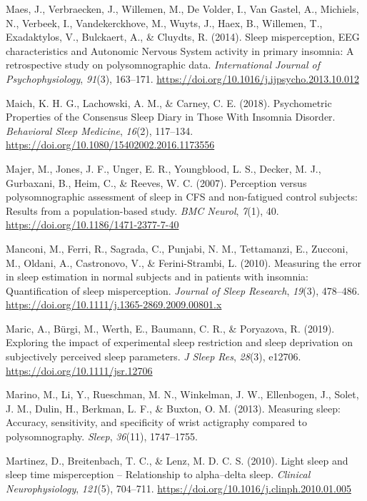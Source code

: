 \documentclass[
]{article}
\newlength{\cslhangindent}
\newenvironment{CSLReferences}[2] %
 {\begin{list}{}{%
  \setlength{\itemindent}{0pt}
  \setlength{\leftmargin}{0pt}
  \setlength{\parsep}{0pt}
  \ifodd #1
   \setlength{\leftmargin}{\cslhangindent}
   \setlength{\itemindent}{-1\cslhangindent}
  \fi
  \setlength{\itemsep}{#2\baselineskip}}}
 {\end{list}}
\begin{document}
\begin{CSLReferences}{1}{0}
Maes, J., Verbraecken, J., Willemen, M., De Volder, I., Van Gastel, A., Michiels, N., Verbeek, I., Vandekerckhove, M., Wuyts, J., Haex, B., Willemen, T., Exadaktylos, V., Bulckaert, A., \& Cluydts, R. (2014). Sleep misperception, {EEG} characteristics and {Autonomic} {Nervous} {System} activity in primary insomnia: {A} retrospective study on polysomnographic data. \emph{International Journal of Psychophysiology}, \emph{91}(3), 163--171. \url{https://doi.org/10.1016/j.ijpsycho.2013.10.012}

Maich, K. H. G., Lachowski, A. M., \& Carney, C. E. (2018). Psychometric {Properties} of the {Consensus} {Sleep} {Diary} in {Those} {With} {Insomnia} {Disorder}. \emph{Behavioral Sleep Medicine}, \emph{16}(2), 117--134. \url{https://doi.org/10.1080/15402002.2016.1173556}

Majer, M., Jones, J. F., Unger, E. R., Youngblood, L. S., Decker, M. J., Gurbaxani, B., Heim, C., \& Reeves, W. C. (2007). Perception versus polysomnographic assessment of sleep in {CFS} and non-fatigued control subjects: Results from a population-based study. \emph{BMC Neurol}, \emph{7}(1), 40. \url{https://doi.org/10.1186/1471-2377-7-40}

Manconi, M., Ferri, R., Sagrada, C., Punjabi, N. M., Tettamanzi, E., Zucconi, M., Oldani, A., Castronovo, V., \& Ferini-Strambi, L. (2010). Measuring the error in sleep estimation in normal subjects and in patients with insomnia: {Quantification} of sleep misperception. \emph{Journal of Sleep Research}, \emph{19}(3), 478--486. \url{https://doi.org/10.1111/j.1365-2869.2009.00801.x}

Maric, A., Bürgi, M., Werth, E., Baumann, C. R., \& Poryazova, R. (2019). Exploring the impact of experimental sleep restriction and sleep deprivation on subjectively perceived sleep parameters. \emph{J Sleep Res}, \emph{28}(3), e12706. \url{https://doi.org/10.1111/jsr.12706}

Marino, M., Li, Y., Rueschman, M. N., Winkelman, J. W., Ellenbogen, J., Solet, J. M., Dulin, H., Berkman, L. F., \& Buxton, O. M. (2013). Measuring sleep: Accuracy, sensitivity, and specificity of wrist actigraphy compared to polysomnography. \emph{Sleep}, \emph{36}(11), 1747--1755.

Martinez, D., Breitenbach, T. C., \& Lenz, M. D. C. S. (2010). Light sleep and sleep time misperception -- {Relationship} to alpha--delta sleep. \emph{Clinical Neurophysiology}, \emph{121}(5), 704--711. \url{https://doi.org/10.1016/j.clinph.2010.01.005}


\end{CSLReferences}
\end{document}
